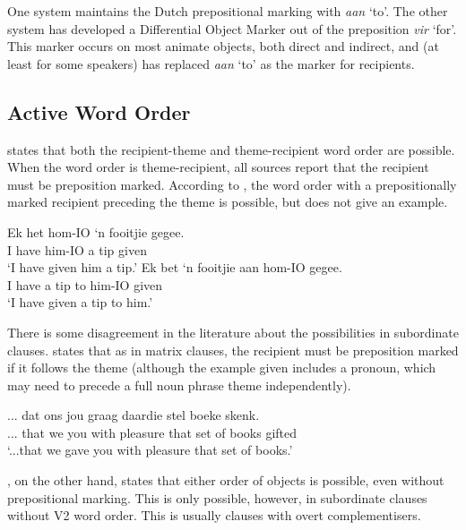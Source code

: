 One system maintains the Dutch prepositional marking with \emph{aan} `to'. The other system has developed a Differential Object Marker out of the preposition \emph{vir} `for'. This marker occurs on most animate objects, both direct and indirect, and (at least for some speakers) has replaced \emph{aan} `to' as the marker for recipients.
\subsection{Active Word Order}
\cite{Stadler.1996} states that both the recipient-theme and theme-recipient word order are possible. When the word order is theme-recipient, all sources report that the recipient must be preposition marked. According to \cite{Stadler.1996}, the word order with a prepositionally marked recipient preceding the theme is possible, but does not give an example.
\begin{exe}
\ex 
\begin{xlist}
\ex \gll Ek het hom-IO `n fooitjie gegee.\\
I have him-IO a tip given\\
\trans `I have given him a tip.'
\ex \gll Ek bet `n fooitjie aan hom-IO gegee.\\
I have a tip to him-IO given\\
\trans `I have given a tip to him.'
\end{xlist}
\end{exe}
There is some disagreement in the literature about the possibilities in subordinate clauses. \cite{Stadler.1996} states that as in matrix clauses, the recipient must be preposition marked if it follows the theme (although the example given includes a pronoun, which may need to precede a full noun phrase theme independently).
\begin{exe}
\ex
\begin{xlist}
\ex \gll ... dat ons jou graag daardie stel boeke skenk.\\
... that we you {with pleasure} that set {of books} gifted\\
\trans `...that we gave you with pleasure that set of books.'
\end{xlist}
\end{exe}
\cite{Louw.2012}, on the other hand, states that either order of objects is possible, even without prepositional marking. This is only possible, however, in subordinate clauses without V2 word order. This is usually clauses with overt complementisers.
